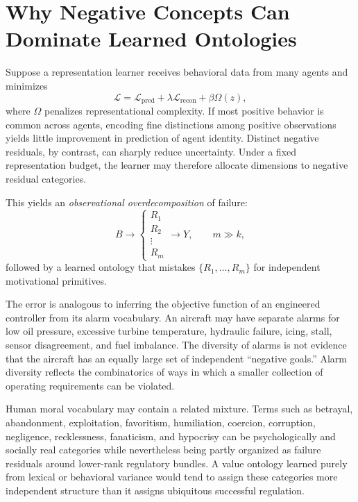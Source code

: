 \documentclass[11pt]{article}
\begin{document}
\section{Why Negative Concepts Can Dominate Learned Ontologies}

Suppose a representation learner receives behavioral data from many agents and minimizes
\begin{equation}
    \mathcal{L}
    =
    \mathcal{L}_{\mathrm{pred}}
    +
    \lambda\mathcal{L}_{\mathrm{recon}}
    +
    \beta\Omega(z),
\end{equation}
where $\Omega$ penalizes representational complexity. If most positive behavior is common across agents, encoding fine distinctions among positive observations yields little improvement in prediction of agent identity. Distinct negative residuals, by contrast, can sharply reduce uncertainty. Under a fixed representation budget, the learner may therefore allocate dimensions to negative residual categories.

This yields an \emph{observational overdecomposition} of failure:
\begin{equation}
    B
    \longrightarrow
    \begin{cases}
       R_1\\
       R_2\\
       \vdots\\
       R_m
    \end{cases}
    \longrightarrow Y,
    \qquad
    m\gg k,
\end{equation}
followed by a learned ontology that mistakes $\{R_1,\ldots,R_m\}$ for independent motivational primitives.

The error is analogous to inferring the objective function of an engineered controller from its alarm vocabulary. An aircraft may have separate alarms for low oil pressure, excessive turbine temperature, hydraulic failure, icing, stall, sensor disagreement, and fuel imbalance. The diversity of alarms is not evidence that the aircraft has an equally large set of independent ``negative goals.'' Alarm diversity reflects the combinatorics of ways in which a smaller collection of operating requirements can be violated.

Human moral vocabulary may contain a related mixture. Terms such as betrayal, abandonment, exploitation, favoritism, humiliation, coercion, corruption, negligence, recklessness, fanaticism, and hypocrisy can be psychologically and socially real categories while nevertheless being partly organized as failure residuals around lower-rank regulatory bundles. A value ontology learned purely from lexical or behavioral variance would tend to assign these categories more independent structure than it assigns ubiquitous successful regulation.
\end{document}
